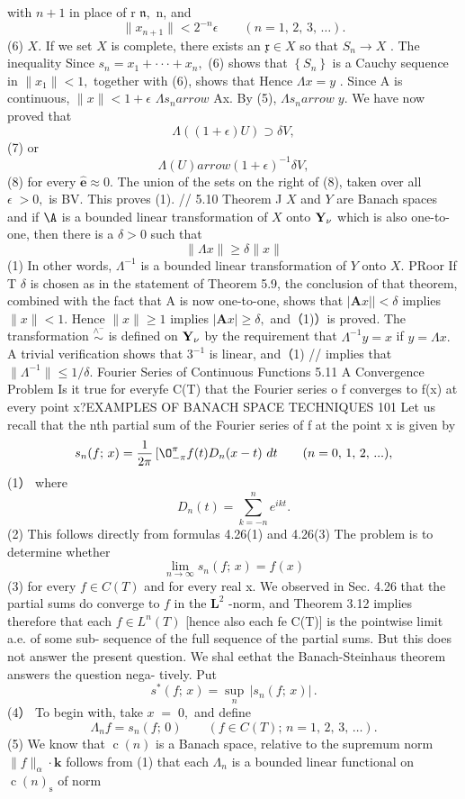 with $n+1$ in place of r ${\mathfrak{n}},$ n, and $$ \|x_{n+1}\|<2^{-n}\epsilon\qquad(n=1,\,2,\,3,\,\ldots). $$ (6) $X.$ If we set $\textstyle X$ is complete, there exists an ${\mathfrak{x}}\in X$ so that $S_{n}\to X$ . The inequality Since $s_{n}=x_{1}+\cdot\cdot\cdot+x_{n},$ (6) shows that $\left\{S_{n}\right\}$ is a Cauchy sequence in $\|x_{1}\|<1,$ together with (6), shows that Hence $\Lambda x=y$ . Since A is continuous, $\|x\|<1+\epsilon$ $\Lambda s_{n}{ arrow}$ Ax. By (5), $\Lambda s_{n}{ arrow}\;y.$ We have now proved that $$ \Lambda((1+\epsilon)U)\supset\delta V, $$ (7) or $$ \Lambda(U) arrow(1+\epsilon)^{-1}\delta V, $$ (8) for every $\mathbf{\hat{\mathbf{e}}}\approx0.$ The union of the sets on the right of (8), taken over all $\scriptstyle\epsilon\;>0,$ is BV. This proves (1). // 5.10 Theorem J $\textstyle X$ and ${\mathbf{}}Y$ are Banach spaces and if $\mathrm{\A}$ is a bounded linear transformation of $X$ onto ${\bf Y_{\nu}}$ which is also one-to-one, then there is a $\scriptstyle\delta>0$ such that $$ \|\Lambda x\|\geq\delta\|x\| $$ (1) In other words, $\Lambda^{-1}$ is a bounded linear transformation of ${\mathbf{}}Y$ onto $X.$ PRoor If T $\delta$ is chosen as in the statement of Theorem 5.9, the conclusion of that theorem, combined with the fact that $\mathrm{A}$ is now one-to-one, shows that $|\mathbf{A}x||<\delta$ implies $\|x\|<1.$ Hence $\|x\|\geq1$ implies $|\mathbf{A}x|\geq\delta,$ and（1)）is proved. The transformation $\stackrel{\wedge^{-}}{\sim}$ is defined on ${\bf Y_{\nu}}$ by the requirement that $\Lambda^{-1}y=x$ if $y=\Lambda x.$ A trivial verification shows that $\scriptstyle3^{-1}$ is linear, and（1) // implies that $\|\Lambda^{-1}\|\leq1/\delta.$ Fourier Series of Continuous Functions 5.11 A Convergence Problem Is it true for everyfe C(T) that the Fourier series o f converges to f(x) at every point x?EXAMPLES OF BANACH SPACE TECHNIQUES 101 Let us recall that the nth partial sum of the Fourier series of f at the point x is given by $$ s_{n}(f;\,x)=\frac{1}{2\pi}\, [\O_{-\pi}^{\pi}f(t)D_{n}(x-t)\ d t\qquad(n=0,\,1,\,2,\,...), $$ (1） where $$ D_{n}(t)=\sum_{k=-n}^{n}e^{i k t}. $$ (2) This follows directly from formulas 4.26(1) and 4.26(3) The problem is to determine whether $$ \operatorname*{lim}_{n\to\infty}s_{n}(f;\,x)=f(x) $$ (3) for every $f\in C(T)$ and for every real x. We observed in Sec. 4.26 that the partial sums do converge to $\boldsymbol{\mathit{f}}$ in the ${\boldsymbol{L}}^{2}$ -norm, and Theorem 3.12 implies therefore that each $f\in L^{n}(T)$ [hence also each fe C(T)] is the pointwise limit a.e. of some sub- sequence of the full sequence of the partial sums. But this does not answer the present question. We shal eethat the Banach-Steinhaus theorem answers the question nega- tively. Put $$ s^{*}(f;\,x)=\operatorname*{sup}_{n}\,{\vert s_{n}(f;\,x)\vert}\,. $$ (4） To begin with, take $\scriptstyle x\;=\;0,$ and define $$ \Lambda_{n}f=s_{n}(f;\,0)\qquad(f\in C(T);\,n=1,\,2,\,3,\,\ldots). $$ (5) We know that $\operatorname{c}(n)$ is a Banach space, relative to the supremum norm $\|f\|_{\alpha}\cdot\mathbf{k}$ follows from (1) that each $\Lambda_{n}$ is a bounded linear functional on $\operatorname{c}(n)_{\mathrm{s}}$ of norm $$ 